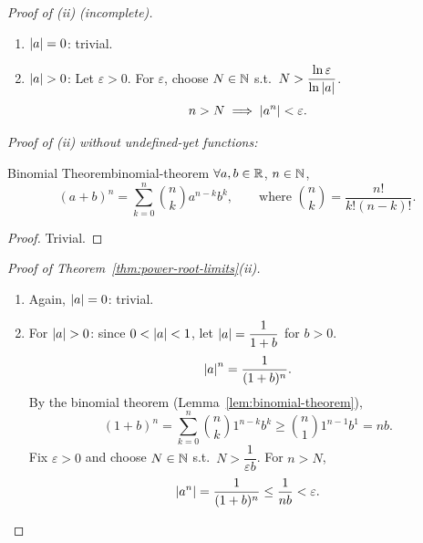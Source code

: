 \noindent\textit{Proof of (ii) (incomplete).}
\begin{enumerate}[label=Case \arabic*., proofparts]
  \item $\left\lvert a \right\rvert=0$: trivial.
  \item $\left\lvert a \right\rvert>0$:
        Let $\varepsilon>0$.
        For $\varepsilon$, choose $N\in\mathbb{N}$ s.t.\ $N>\dfrac{\ln\varepsilon}{\ln\left\lvert a \right\rvert}$.
        \[
          n>N\implies\left\lvert a^n \right\rvert<\varepsilon.
        \]
\end{enumerate}

\noindent\textit{Proof of (ii) without undefined-yet functions:}

\begin{lemma}{Binomial Theorem}{binomial-theorem}
  $\forall a,b\in\mathbb{R}$, $n\in\mathbb{N}$,
  \[
    (a+b)^n=\sum_{k=0}^n\binom nk a^{n-k}b^k,
    \qquad\text{where }\binom nk=\frac{n!}{k!(n-k)!}.
  \]
\end{lemma}
\begin{proof}
  Trivial.
\end{proof}

\begin{proof}[Proof of Theorem~\ref{thm:power-root-limits}(ii)]\proofheadingbreak
  \begin{enumerate}[label=Case \arabic*., proofparts]
    \item Again, $\left\lvert a \right\rvert=0$: trivial.
    \item For $\left\lvert a \right\rvert>0$: since $0<\left\lvert a \right\rvert<1$, let $\left\lvert a \right\rvert=\dfrac1{1+b}$ for $b>0$.
          \[
            \left\lvert a \right\rvert^n=\frac1{(1+b)^n}.
          \]
          By the binomial theorem (Lemma~\ref{lem:binomial-theorem}),
          \[
            (1+b)^n=\sum_{k=0}^n\binom nk1^{n-k}b^k
            \ge\binom n1 1^{n-1}b^1=nb.
          \]
          Fix $\varepsilon>0$ and choose $N\in\mathbb{N}$ s.t.\ $N>\dfrac1{\varepsilon b}$.
          For $n>N$,
          \[
            \left\lvert a^n \right\rvert=\frac1{(1+b)^n}\le\frac1{nb}<\varepsilon.\qedhere
          \]
  \end{enumerate}
\end{proof}

